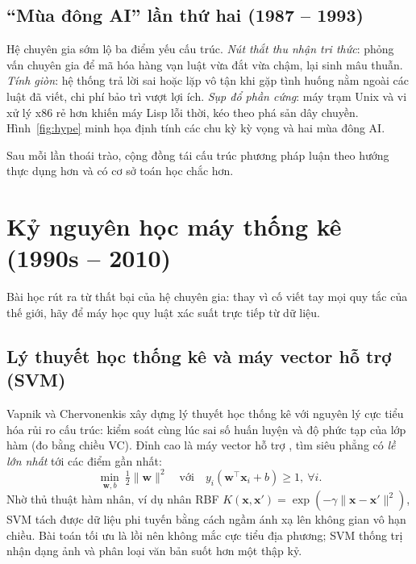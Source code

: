 \subsection{“Mùa đông AI” lần thứ hai (1987 -- 1993)}

Hệ chuyên gia sớm lộ ba điểm yếu cấu trúc. \emph{Nút thắt thu nhận tri thức}: phỏng vấn chuyên gia để mã hóa hàng vạn
luật vừa đắt vừa chậm, lại sinh mâu thuẫn. \emph{Tính giòn}: hệ thống trả lời sai hoặc lặp vô tận khi gặp tình huống
nằm ngoài các luật đã viết, chi phí bảo trì vượt lợi ích. \emph{Sụp đổ phần cứng}: máy trạm Unix và vi xử lý x86 rẻ
hơn khiến máy Lisp lỗi thời, kéo theo phá sản dây chuyền. Hình~\ref{fig:hype} minh họa định tính các chu kỳ kỳ vọng và
hai mùa đông AI.


Sau mỗi lần thoái trào, cộng đồng tái cấu trúc phương pháp luận theo hướng thực dụng hơn và có cơ sở toán học chắc hơn.

\section{Kỷ nguyên học máy thống kê (1990s -- 2010)}

Bài học rút ra từ thất bại của hệ chuyên gia: thay vì cố viết tay mọi quy tắc của thế giới, hãy để máy học quy luật
xác suất trực tiếp từ dữ liệu.

\subsection{Lý thuyết học thống kê và máy vector hỗ trợ (SVM)}

Vapnik và Chervonenkis xây dựng lý thuyết học thống kê với nguyên lý cực tiểu hóa rủi ro cấu trúc: kiểm soát cùng lúc
sai số huấn luyện và độ phức tạp của lớp hàm (đo bằng chiều VC). Đỉnh cao là máy vector hỗ trợ \cite{cortes1995}, tìm
siêu phẳng có \emph{lề lớn nhất} tới các điểm gần nhất:
\begin{equation}
  \min_{\mathbf{w}, b}\ \tfrac{1}{2}\lVert \mathbf{w} \rVert^2 \quad \text{với}\quad y_i(\mathbf{w}^\top\mathbf{x}_i + b) \ge 1,\ \forall i.
\end{equation}
Nhờ thủ thuật hàm nhân, ví dụ nhân RBF $K(\mathbf{x}, \mathbf{x}') = \exp(-\gamma\lVert\mathbf{x}-\mathbf{x}'\rVert^2)$,
SVM tách được dữ liệu phi tuyến bằng cách ngầm ánh xạ lên không gian vô hạn chiều. Bài toán tối ưu là lồi nên không
mắc cực tiểu địa phương; SVM thống trị nhận dạng ảnh và phân loại văn bản suốt hơn một thập kỷ.

